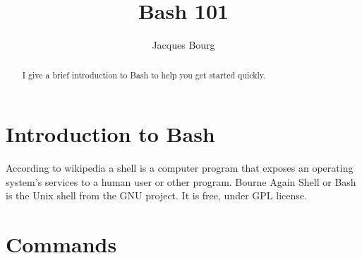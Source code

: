 \documentclass[24pt]{article}
\title{Bash 101}
\author{Jacques Bourg}
\begin{document}
\maketitle

\begin{abstract}
  I give a brief introduction to Bash to help you get started quickly.
\end{abstract}




\section{Introduction to Bash}
According to wikipedia a shell is a computer program that exposes an operating system's services to a human user or other program. Bourne Again Shell or Bash is the Unix shell  from the  GNU project. It is free, under GPL license.

\section{Commands}
\end{document}
